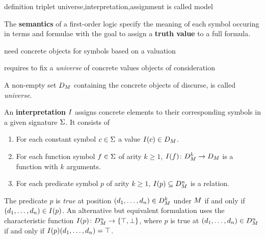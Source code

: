             definition triplet universe,interpretation,assignment is called model

            The \textbf{semantics} of a first-order logic specify the meaning of each symbol occuring in terms and formulae with the goal to assign a \textbf{truth value} to a full formula.

            need concrete objects for symbols
            based on a valuation

            requires to fix a \emph{universe} of concrete values
            objects of consideration

            \begin{definition}[Universe]
                A non-empty set $D_{M}$ containing the concrete objects of discurse, is called \emph{universe}.
            \end{definition}

            \begin{definition}[Interpretation]
                An \textbf{interpretation} $\interpret$ assigns concrete elements to their corresponding symbols in a given signature $\Sigma$. It consists of
                \begin{enumerate}
                    \item For each constant symbol $c\in\Sigma$ a value $\interpret[c]\in\universe$.
                    \item For each function symbol $f\in\Sigma$ of arity $k\geq 1$, $\interpret[f]\from\universe^k\to\universe$ is a function with $k$ arguments.
                    \item For each predicate symbol $p$ of arity $k\geq 1$, $\interpret[p]\subseteq\universe^n$ is a relation.
                \end{enumerate}

            \end{definition}


            The predicate $p$ is \emph{true} at position $(d_1,\ldots,d_n)\in D_{M}^k$ under $M$ if and only if $(\range{d_1}{d_n})\in\interpret[p]$.
            An alternative but equivalent formulation uses the characteristic function $\interpret[p]\from\universe^n\to\{\ltrue,\lfalse\}$, where $p$ is true at $(d_1,\ldots,d_n)\in D_{M}^n$ if and only if $\interpret[p](\range{d_1}{d_n})=\ltrue$.

